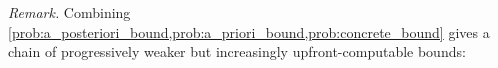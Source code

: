 \documentclass[11pt]{article}
\begin{document}




\emph{Remark.} Combining \cref{prob:a_posteriori_bound,prob:a_priori_bound,prob:concrete_bound} gives a chain of progressively weaker but increasingly upfront-computable bounds:
\end{document}
